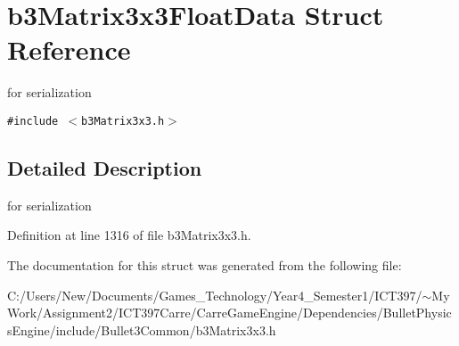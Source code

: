 \hypertarget{structb3_matrix3x3_float_data}{
\section{b3Matrix3x3FloatData Struct Reference}
\label{structb3_matrix3x3_float_data}
}
for serialization  


{\tt \#include $<$b3Matrix3x3.h$>$}



\subsection{Detailed Description}
for serialization 

Definition at line 1316 of file b3Matrix3x3.h.

The documentation for this struct was generated from the following file:\begin{CompactItemize}
\item 
C:/Users/New/Documents/Games\_\-Technology/Year4\_\-Semester1/ICT397/$\sim$My Work/Assignment2/ICT397Carre/CarreGameEngine/Dependencies/BulletPhysicsEngine/include/Bullet3Common/b3Matrix3x3.h\end{CompactItemize}
